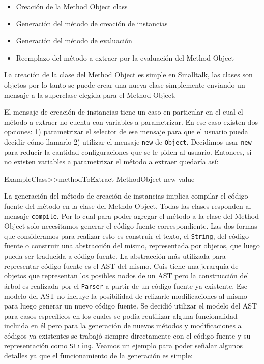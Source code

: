 \begin{itemize}
    \item Creación de la Method Object class
    \item Generación del método de creación de instancias
    \item Generación del método de evaluación
    \item Reemplazo del método a extraer por la evaluación del Method Object
\end{itemize}

La creación de la clase del Method Object es simple en Smalltalk, las clases son objetos por lo
tanto se puede crear una nueva clase simplemente enviando un mensaje a la superclase elegida para el
Method Object.

El mensaje de creación de instancias tiene un caso en particular en el cual el método a extraer no
cuenta con variables a parametrizar. En ese caso existen dos opciones: 1) parametrizar el selector
de ese mensaje para que el usuario pueda decidir cómo llamarlo 2) utilizar el mensaje \lstinline{new}
de \lstinline{Object}. Decidimos usar \lstinline{new} para reducir la cantidad configuraciones que se
le piden al usuario. Entonces, si no existen variables a parametrizar el método a extraer quedaría
así:

\begin{code}
ExampleClass>>methodToExtract
    MethodObject new value
\end{code}

La generación del método de creación de instancias implica compilar el código fuente del método en
la clase del Methdo Object. Todas las clases responden al mensaje \lstinline{compile}. Por lo cual
para poder agregar el método a la clase del Method Object solo necesitamos generar el código fuente
correspondiente. Las dos formas que consideramos para realizar esto es construir el texto, el
\lstinline{String}, del código fuente o construir una abstracción del mismo, representada por
objetos, que luego pueda ser traducida a código fuente. La abstracción más utilizada para
representar código fuente es el AST del mismo. Cuis tiene una jerarquía de objetos que representan
los posibles nodos de un AST pero la construcción del árbol es realizada por el \lstinline{Parser} a
partir de un código fuente ya existente. Ese modelo del AST no incluye la posibilidad de relizarle
modificaciones al mismo para luego generar un nuevo código fuente. Se decidió utilizar el modelo del
AST para casos específicos en los cuales se podía reutilizar alguna funcionalidad incluida en él pero
para la generación de nuevos métodos y modificaciones a códigos ya existentes se trabajó siempre
directamente con el código fuente y su representación como \lstinline{String}. Veamos un ejemplo
para poder señalar algunos detalles ya que el funcionamiento de la generación es simple:

